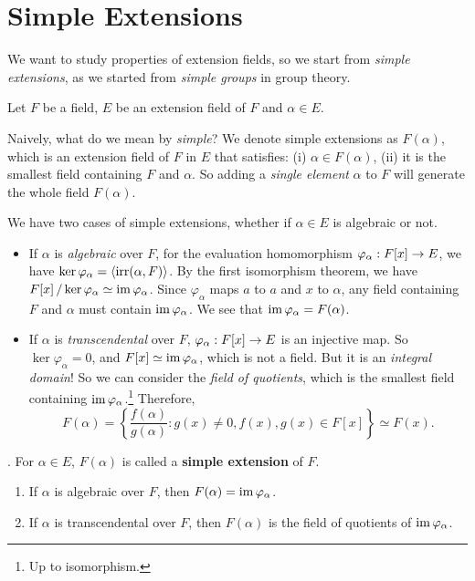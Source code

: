 \section*{Simple Extensions}

We want to study properties of extension fields, so we start from \textit{simple extensions}, as we started from \textit{simple groups} in group theory.

Let \(F\) be a field, \(E\) be an extension field of \(F\) and \(\alpha \in E\).

Naively, what do we mean by \textit{simple}? We denote simple extensions as \(F(\alpha)\), which is an extension field of \(F\) in \(E\) that satisfies: (i) \(\alpha \in F(\alpha)\), (ii) it is the smallest field containing \(F\) and \(\alpha\). So adding a \textit{single element} \(\alpha\) to \(F\) will generate the whole field \(F(\alpha)\).

We have two cases of simple extensions, whether if \(\alpha \in E\) is algebraic or not.

\begin{itemize}
    \item If \(\alpha\) is \textit{algebraic} over \(F\), for the evaluation homomorphism \(\varphi_\alpha : F[x] \rightarrow E\), we have \(\ker \varphi_\alpha = \left\langle \mathrm{irr}(\alpha, F) \right\rangle\). By the first isomorphism theorem, we have \(F[x] \operatorname{/} \ker\varphi_\alpha \simeq \operatorname{im} \varphi_\alpha\). Since \(\varphi_\alpha\) maps \(a\) to \(a\) and \(x\) to \(\alpha\), any field containing \(F\) and \(\alpha\) must contain \(\operatorname{im} \varphi_\alpha\). We see that \(\operatorname{im} \varphi_\alpha = F(\alpha)\).

    \item If \(\alpha\) is \textit{transcendental} over \(F\), \(\varphi_\alpha : F[x] \rightarrow E\) is an injective map. So \(\ker \varphi_\alpha = 0\), and \(F[x] \simeq \operatorname{im}\varphi_\alpha\), which is not a field. But it is an \textit{integral domain}! So we can consider the \textit{field of quotients}, which is the smallest field containing \(\operatorname{im} \varphi_\alpha\).\footnote{Up to isomorphism.} Therefore,
    \[
        F(\alpha) = \left\{\frac{f(\alpha)}{g(\alpha)} : g(x) \neq 0, f(x), g(x) \in F[x]\right\} \simeq F(x).
    \]
\end{itemize}

.  For \(\alpha \in E\), \(F(\alpha)\) is called a \textbf{simple extension} of \(F\).
\begin{enumerate}
    \item If \(\alpha\) is algebraic over \(F\), then \(F(\alpha) = \operatorname{im} \varphi_\alpha\).
    \item If \(\alpha\) is transcendental over \(F\), then \(F(\alpha)\) is the field of quotients of \(\operatorname{im} \varphi_\alpha\).
\end{enumerate}

